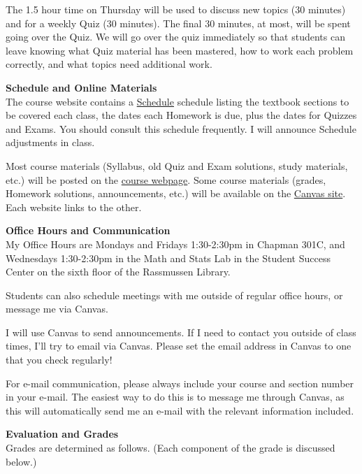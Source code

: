 \documentclass[12pt]{article}
\renewcommand{\emph}[1]{\textsf{\textbf{#1}}}
\newcommand{\localhead}[1]{\par\smallskip\textbf{#1} \smallskip\nobreak\\}%
\def\heading#1{\localhead{\large\emph{#1}}}
\begin{document}
The 1.5 hour time on Thursday will be used to discuss new topics (30
minutes) and for a weekly Quiz (30 minutes).  The final 30 minutes, at
most, will be spent going over the Quiz.  We will go over the quiz
immediately so that students can leave knowing what Quiz material has
been mastered, how to work each problem correctly, and what topics
need additional work.


\clearpage\newpage

\strut

\vspace{-12pt}

\heading{Schedule and Online Materials}
The course website contains a
\href{https://uaf-math251.github.io/calc2/assets/general/S25/meek/schedule.pdf}{Schedule}
schedule
listing the textbook sections to be covered each class, the dates each
Homework is due, plus the dates for Quizzes and Exams. You should
consult this schedule frequently.  I will announce Schedule
adjustments in class.

Most course materials (Syllabus, old Quiz and Exam solutions, study materials, etc.) will be posted on the \href{https://uaf-math251.github.io/calc2/}{course webpage}.  Some course materials (grades, Homework solutions, announcements, etc.) will be available on the \href{https://canvas.alaska.edu/courses/24107}{Canvas site}.  Each website links to the other.


\heading{Office Hours and Communication}
My Office Hours are Mondays and Fridays 1:30-2:30pm in Chapman 301C, and
Wednesdays 1:30-2:30pm in the Math and Stats Lab in the Student
Success Center on the sixth floor of the Rassmussen Library.

Students can also schedule meetings with me outside of regular office
hours, or message me via Canvas.


I will use Canvas to send announcements.  If I need to contact you
outside of class times, I'll try to email via Canvas.  Please set the
email address in Canvas to one that you check regularly!

For e-mail communication, please always include your course and
section number in your e-mail. The easiest way to do this is to
message me through Canvas, as this will automatically send me an
e-mail with the relevant information included.


\heading{Evaluation and Grades}
Grades are determined as follows.  (Each component of the grade is discussed below.)
 
\end{document}

